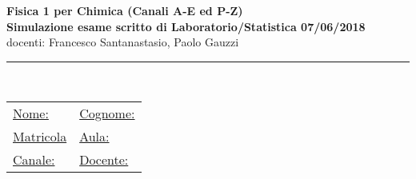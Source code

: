 \documentclass[10pt,a4paper,fleqn]{article}
\begin{document}
\pagestyle{empty}

%
%
\newsavebox{\savepar}
\newenvironment{boxit}{\begin{lrbox}{\savepar}
\begin{minipage}[b]{16.0cm}}
{\end{minipage}\end{lrbox}\fbox{\usebox{\savepar}}}
\newcommand{\myblist}[1]{\begin{list}{#1}{\setlength{\topsep}{1.8mm}
\setlength{\parskip}{0mm} \setlength{\partopsep}{0mm} \setlength{\parsep}{0mm}
\setlength{\itemsep}{0mm}}}
\newcommand{\myhfill}[1]{\hfill {\it #1} = \underline{$~~~~~~~~~~~~~~~~~~~~~~~~~~~$}}
\newcommand{\myhfiyn}[0]{\hfill $\Box$~{\sc si}~~~~~~~~$\Box$~{\sc no}}
\newcommand{\myhfild}[2]
{\hfill {\it #1}= \underline{$~~~~~~~~~~$};~ {\it #2}= \underline{$~~~~~~~~~~$}}
\newcommand{\myhfilt}[3]
{\hfill {\it #1}= \underline{$~~~~~~~~~~~~~$};~ 
{\it #2}= \underline{$~~~~~~~~~~~~~$};~{\it #3}= \underline{$~~~~~~~~~~~~~$}}
%

\setlength{\unitlength}{1mm} 
\setlength{\headheight}{0mm} %

\newcommand{\s}{\text{s}}
\newcommand{\km}{\text{km}}
\newcommand{\kg}{\text{kg}}


\vspace*{-3.5cm}
\Large
{
\begin{center}
\vspace{0.1cm}
{\bf  Fisica 1 per Chimica (Canali A-E ed P-Z)} \\
{\bf Simulazione esame scritto di Laboratorio/Statistica 07/06/2018}   \\
docenti: Francesco Santanastasio, Paolo Gauzzi
   \\
\end{center}
\noindent\rule{13cm}{0.4pt}  \\
\normalsize
%
\begin{tabular}{ll}
{\underline{Nome:}}  \hspace{6cm} & {\underline{Cognome:}} \\[0.35cm]
{\underline {Matricola}} & {\underline {Aula:}}  \\[0.35cm]
{\underline {Canale:}} & {\underline {Docente:}}
\end{tabular}
\vspace{0.5cm}
}
\small
\end{document}

